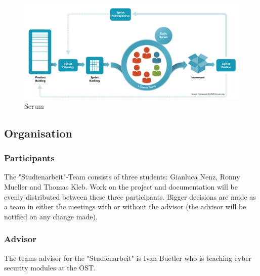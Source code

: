 \begin{figure}[h]
    \includegraphics[width=\linewidth]{04_Project-Documentation/scrum.png}
    \caption{Scrum}
    \label{scrum_img}
\end{figure}
\subsection{Organisation}

\subsubsection*{Participants}
The "Studienarbeit"-Team consists of three students: Gianluca Nenz, Ronny Muel\-ler and Thomas Kleb. Work on the project and documentation will be evenly distributed between these three participants. Bigger decisions are made as a team in either the meetings with or without the advisor (the advisor will be notified on any change made).

\subsubsection*{Advisor}
The teams advisor for the "Studienarbeit" is Ivan Buetler who is teaching cyber security modules at the OST.

